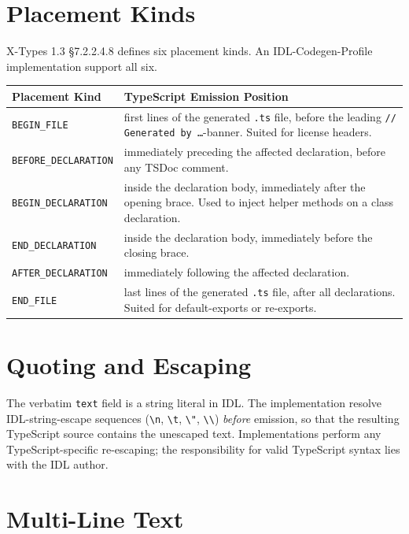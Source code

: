 \documentclass{../styles/zerodds-vendor-spec}
\begin{document}
\section{Placement Kinds}

X-Types 1.3 §7.2.2.4.8 defines six placement kinds. An
IDL-Codegen-Profile implementation  support all six.

\begin{longtable}{p{4cm}p{8cm}}
  \toprule
  \textbf{Placement Kind} & \textbf{TypeScript Emission Position} \\
  \midrule
  \endhead
  \texttt{BEGIN\_FILE}          & first lines of the generated \texttt{.ts} file, before the leading \texttt{// Generated by \ldots}-banner. Suited for license headers. \\
  \texttt{BEFORE\_DECLARATION}  & immediately preceding the affected declaration, before any TSDoc comment. \\
  \texttt{BEGIN\_DECLARATION}   & inside the declaration body, immediately after the opening brace. Used to inject helper methods on a class declaration. \\
  \texttt{END\_DECLARATION}     & inside the declaration body, immediately before the closing brace. \\
  \texttt{AFTER\_DECLARATION}   & immediately following the affected declaration. \\
  \texttt{END\_FILE}            & last lines of the generated \texttt{.ts} file, after all declarations. Suited for default-exports or re-exports. \\
  \bottomrule
\end{longtable}

\section{Quoting and Escaping}

The verbatim \texttt{text} field is a string literal in IDL. The
implementation  resolve IDL-string-escape sequences
(\texttt{\textbackslash n}, \texttt{\textbackslash t},
\texttt{\textbackslash "}, \texttt{\textbackslash\textbackslash})
\emph{before} emission, so that the resulting TypeScript source
contains the unescaped text. Implementations 
perform any TypeScript-specific re-escaping; the responsibility
for valid TypeScript syntax lies with the IDL author.

\section{Multi-Line Text}
\end{document}
